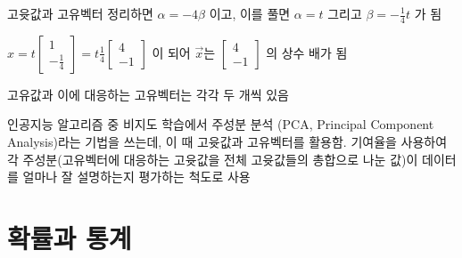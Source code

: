 \documentclass[10pt,t]{beamer}
\begin{document}
\begin{frame}{고윳값과 고유벡터}
정리하면 $\alpha = -4 \beta$ 이고, 이를 풀면 $\alpha = t$ 그리고 $\beta = -\frac{1}{4}t$ 가 됨

$x = t \begin{bmatrix}
    1\\
    -\frac{1}{4}
\end{bmatrix}=t \frac{1}{4}\begin{bmatrix}
    4\\
    -1
\end{bmatrix}$ 이 되어 $\vec{x}$는 $\begin{bmatrix}
    4 \\
    -1
\end{bmatrix}$ 의 상수 배가 됨

고유값과 이에 대응하는 고유벡터는 각각 두 개씩 있음

\pagebreak

인공지능 알고리즘 중 비지도 학습에서 주성분 분석 (PCA, Principal Component Analysis)라는 기법을 쓰는데, 이 때 고윳값과 고유벡터를 활용함. 기여율을 사용하여 각 주성분(고유벡터에 대응하는 고윳값을 전체 고윳값들의 총합으로 나눈 값)이 데이터를 얼마나 잘 설명하는지 평가하는 척도로 사용


\end{frame}

\section{확률과 통계}
\end{document}
